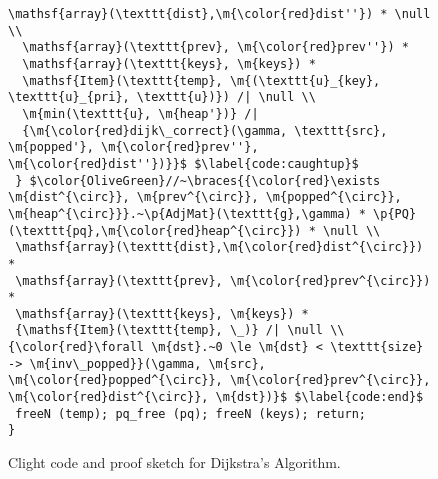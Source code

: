 \begin{figure}[t]
\begin{lstlisting}[mathescape=true,showlines=true]
  \mathsf{array}(\texttt{dist},\m{\color{red}dist''}) * \null \\
  \mathsf{array}(\texttt{prev}, \m{\color{red}prev''}) *
  \mathsf{array}(\texttt{keys}, \m{keys}) *
  \mathsf{Item}(\texttt{temp}, \m{(\texttt{u}_{key}, \texttt{u}_{pri}, \texttt{u})}) /| \null \\
  \m{min(\texttt{u}, \m{heap'})} /|
  {\m{\color{red}dijk\_correct}(\gamma, \texttt{src}, \m{popped'}, \m{\color{red}prev''}, \m{\color{red}dist''})}}$ $\label{code:caughtup}$
 } $\color{OliveGreen}//~\braces{{\color{red}\exists \m{dist^{\circ}}, \m{prev^{\circ}}, \m{popped^{\circ}}, \m{heap^{\circ}}}.~\p{AdjMat}(\texttt{g},\gamma) * \p{PQ}(\texttt{pq},\m{\color{red}heap^{\circ}}) * \null \\
 \mathsf{array}(\texttt{dist},\m{\color{red}dist^{\circ}}) * 
 \mathsf{array}(\texttt{prev}, \m{\color{red}prev^{\circ}}) *
 \mathsf{array}(\texttt{keys}, \m{keys}) * 
 {\mathsf{Item}(\texttt{temp}, \_)} /| \null \\
{\color{red}\forall \m{dst}.~0 \le \m{dst} < \texttt{size} -> \m{inv\_popped}}(\gamma, \m{src}, \m{\color{red}popped^{\circ}}, \m{\color{red}prev^{\circ}}, \m{\color{red}dist^{\circ}}, \m{dst})}$ $\label{code:end}$
 freeN (temp); pq_free (pq); freeN (keys); return; 
}
\end{lstlisting}
\vspace{-1em}
\caption{Clight code and proof sketch for Dijkstra's Algorithm.}
\vspace{-1em}
\label{fig:decorated}
\end{figure} 